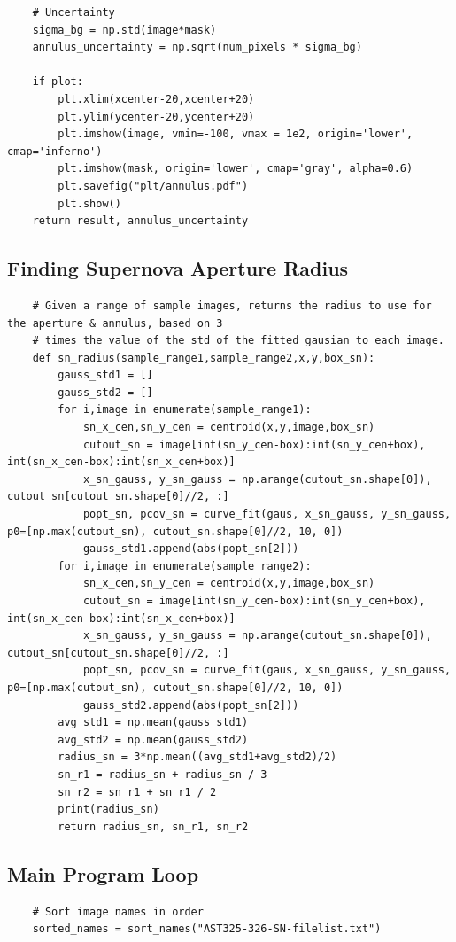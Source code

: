 \documentclass{article}
\begin{document}
\begin{appendices}
\begin{verbatim}
    # Uncertainty
    sigma_bg = np.std(image*mask)
    annulus_uncertainty = np.sqrt(num_pixels * sigma_bg)
    
    if plot:
        plt.xlim(xcenter-20,xcenter+20)
        plt.ylim(ycenter-20,ycenter+20)
        plt.imshow(image, vmin=-100, vmax = 1e2, origin='lower', cmap='inferno')
        plt.imshow(mask, origin='lower', cmap='gray', alpha=0.6)
        plt.savefig("plt/annulus.pdf")
        plt.show()
    return result, annulus_uncertainty
\end{verbatim}

\subsection{Finding Supernova Aperture Radius}
\begin{verbatim}
    # Given a range of sample images, returns the radius to use for the aperture & annulus, based on 3
    # times the value of the std of the fitted gausian to each image. 
    def sn_radius(sample_range1,sample_range2,x,y,box_sn):
        gauss_std1 = []
        gauss_std2 = []
        for i,image in enumerate(sample_range1):
            sn_x_cen,sn_y_cen = centroid(x,y,image,box_sn)
            cutout_sn = image[int(sn_y_cen-box):int(sn_y_cen+box), int(sn_x_cen-box):int(sn_x_cen+box)]
            x_sn_gauss, y_sn_gauss = np.arange(cutout_sn.shape[0]), cutout_sn[cutout_sn.shape[0]//2, :]
            popt_sn, pcov_sn = curve_fit(gaus, x_sn_gauss, y_sn_gauss, p0=[np.max(cutout_sn), cutout_sn.shape[0]//2, 10, 0])
            gauss_std1.append(abs(popt_sn[2]))
        for i,image in enumerate(sample_range2):
            sn_x_cen,sn_y_cen = centroid(x,y,image,box_sn)
            cutout_sn = image[int(sn_y_cen-box):int(sn_y_cen+box), int(sn_x_cen-box):int(sn_x_cen+box)]
            x_sn_gauss, y_sn_gauss = np.arange(cutout_sn.shape[0]), cutout_sn[cutout_sn.shape[0]//2, :]
            popt_sn, pcov_sn = curve_fit(gaus, x_sn_gauss, y_sn_gauss, p0=[np.max(cutout_sn), cutout_sn.shape[0]//2, 10, 0])
            gauss_std2.append(abs(popt_sn[2]))
        avg_std1 = np.mean(gauss_std1)
        avg_std2 = np.mean(gauss_std2)
        radius_sn = 3*np.mean((avg_std1+avg_std2)/2)
        sn_r1 = radius_sn + radius_sn / 3
        sn_r2 = sn_r1 + sn_r1 / 2
        print(radius_sn)
        return radius_sn, sn_r1, sn_r2
\end{verbatim}

\subsection{Main Program Loop}
\begin{verbatim}
    # Sort image names in order
    sorted_names = sort_names("AST325-326-SN-filelist.txt")
    

\end{verbatim}
\end{appendices}
\end{document}
